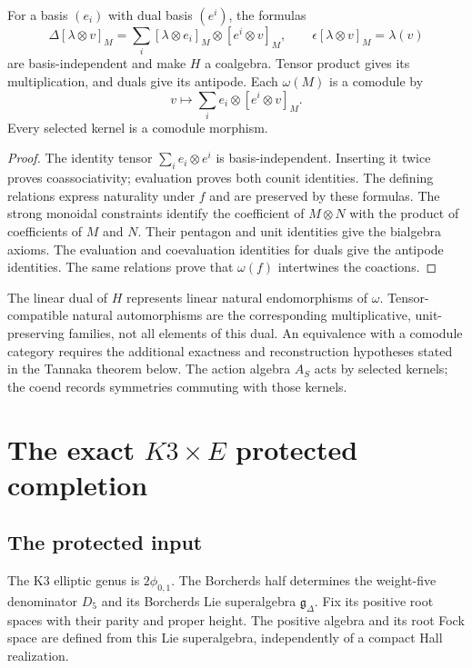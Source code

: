 \begin{proposition}\label{cyiv:k3-coend}
For a basis $(e_i)$ with dual basis $(e^i)$, the formulas
\[
 \Delta[\lambda\otimes v]_M
 =\sum_i[\lambda\otimes e_i]_M\otimes[e^i\otimes v]_M,
 \qquad \epsilon[\lambda\otimes v]_M=\lambda(v)
\]
are basis-independent and make $H$ a coalgebra.
Tensor product gives its multiplication, and duals give its antipode.
Each $\omega(M)$ is a comodule by
\[
 v\longmapsto\sum_i e_i\otimes[e^i\otimes v]_M.
\]
Every selected kernel is a comodule morphism.
\end{proposition}
\begin{proof}
The identity tensor $\sum_i e_i\otimes e^i$ is basis-independent.
Inserting it twice proves coassociativity; evaluation proves both
counit identities.
The defining relations express naturality under $f$ and are preserved
by these formulas.
The strong monoidal constraints identify the coefficient of $M\otimes N$
with the product of coefficients of $M$ and $N$.
Their pentagon and unit identities give the bialgebra axioms.
The evaluation and coevaluation identities for duals give the antipode
identities.
The same relations prove that $\omega(f)$ intertwines the coactions.
\end{proof}

The linear dual of $H$ represents linear natural endomorphisms of
$\omega$.
Tensor-compatible natural automorphisms are the corresponding
multiplicative, unit-preserving families, not all elements of this dual.
An equivalence with a comodule category requires the additional exactness
and reconstruction hypotheses stated in the Tannaka theorem below.
The action algebra $A_S$ acts by selected kernels; the coend records
symmetries commuting with those kernels.

\part{The exact \texorpdfstring{$K3\times E$}{K3 x E} protected completion}

\chapter{The protected input}
The K3 elliptic genus is $2\phi_{0,1}$.
The Borcherds half determines the weight-five denominator $D_5$ and its
Borcherds Lie superalgebra $\mathfrak g_\Delta$.
Fix its positive root spaces with their parity and proper height.
The positive algebra and its root Fock space are defined from this Lie
superalgebra, independently of a compact Hall realization.

